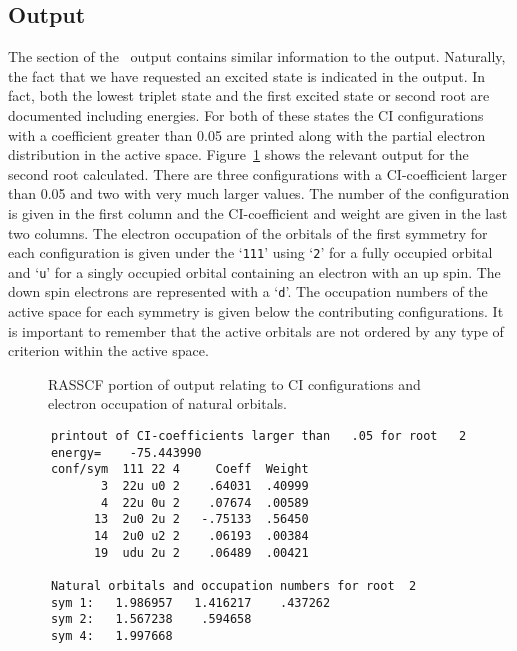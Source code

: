 \subsection{ Output}


The  section of the \molcas\ output contains similar 
information to the 
output. Naturally, the fact that we have requested an excited state is
indicated in the output.  In fact, both the lowest triplet state and the first
excited state or second root are documented including energies.  
For both of these states the CI
configurations with a coefficient greater than 0.05 are printed along 
with the partial electron distribution in the active space.
Figure~\ref{fig:RASSCF_CI} shows the relevant output for the second
root calculated.   There are three configurations with a CI-coefficient 
larger than 0.05 and two with very much larger values.  The number of the
configuration is given in the first column and the CI-coefficient and
weight are given in the last two columns.  The electron occupation of the
orbitals of the first symmetry for each configuration is given under the 
`{\tt 111}' using `{\tt 2}' for a fully occupied orbital and `{\tt u}' 
for a singly occupied orbital containing an electron with an up spin.  
The down spin electrons are represented with a `{\tt d}'. The occupation 
numbers of the active space for each symmetry is given below the contributing 
configurations. It is important to remember that the active orbitals are
not ordered by any type of criterion within the active space.

\begin{figure}[h]
\caption{RASSCF portion of output relating to CI configurations and electron 
occupation of natural orbitals.}
\label{fig:RASSCF_CI}
\end{figure}
{\footnotesize
\begin{verbatim}
      printout of CI-coefficients larger than   .05 for root   2
      energy=    -75.443990
      conf/sym  111 22 4     Coeff  Weight
             3  22u u0 2    .64031  .40999
             4  22u 0u 2    .07674  .00589
            13  2u0 2u 2   -.75133  .56450
            14  2u0 u2 2    .06193  .00384
            19  udu 2u 2    .06489  .00421

      Natural orbitals and occupation numbers for root  2
      sym 1:   1.986957   1.416217    .437262
      sym 2:   1.567238    .594658
      sym 4:   1.997668
\end{verbatim}}

